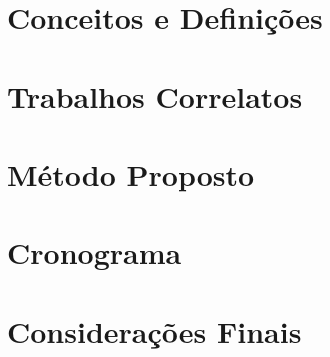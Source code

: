 \documentclass[
    12pt,       %
    oneside,    %
    a4paper,    %
%
    chapter=TITLE,	  	  %
%
    english,			  %
    brazil				  %
%
]{abntex2}
\begin{document}
\chapter{Conceitos e Definições}
\label{ch:fundamentacao}


\chapter{Trabalhos Correlatos}
\label{ch:correlatos}
%


\chapter{Método Proposto}
\label{chapter:metodo}


\chapter{Cronograma}
\label{ch:cronograma}
%

\chapter{Considerações Finais}
\label{ch:consideracoes}
%
%


\printindex
\end{document}
